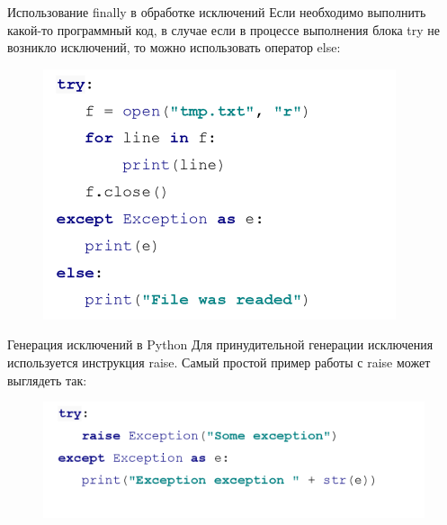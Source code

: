 \documentclass[xcolor=table]{beamer}
\begin{document}
\begin{frame}{Использование finally в обработке исключений}
	Если необходимо выполнить какой-то программный код, в случае если в процессе выполнения блока try не возникло исключений, то можно использовать оператор else:
	\begin{figure}[h]
		\centering
		\includegraphics[scale=0.7]{images/lec08-pic10-python.png}
	\end{figure}	
\end{frame}

\begin{frame}{Генерация исключений в Python}
	Для принудительной генерации исключения используется инструкция raise. Самый простой пример работы с raise может выглядеть так:
	\begin{figure}[h]
		\centering
		\includegraphics[scale=0.7]{images/lec08-pic11-python.png}
	\end{figure}	
\end{frame}
\end{document}

